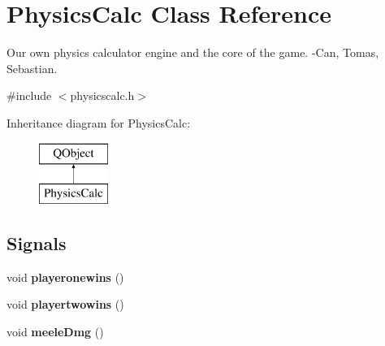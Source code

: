\hypertarget{class_physics_calc}{}\section{Physics\+Calc Class Reference}
\label{class_physics_calc}


Our own physics calculator engine and the core of the game. -\/\+Can, Tomas, Sebastian.  




{\ttfamily \#include $<$physicscalc.\+h$>$}

Inheritance diagram for Physics\+Calc\+:\begin{figure}[H]
\begin{center}
\leavevmode
\includegraphics[height=2.000000cm]{class_physics_calc}
\end{center}
\end{figure}
\subsection*{Signals}
\begin{DoxyCompactItemize}
\item 
void {\bfseries playeronewins} ()\hypertarget{class_physics_calc_a6790d05bf566005c0f8f4fb979eeabae}{}\label{class_physics_calc_a6790d05bf566005c0f8f4fb979eeabae}

\item 
void {\bfseries playertwowins} ()\hypertarget{class_physics_calc_aee47b83ee796e172207ef43885fe1e11}{}\label{class_physics_calc_aee47b83ee796e172207ef43885fe1e11}

\item 
void {\bfseries meele\+Dmg} ()\hypertarget{class_physics_calc_a869e988d2f13341a0e0fcd22a99963aa}{}\label{class_physics_calc_a869e988d2f13341a0e0fcd22a99963aa}

\end{DoxyCompactItemize}
